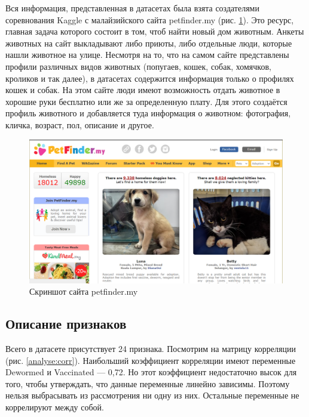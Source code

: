 \documentclass[14pt]{mmcs_article}
\begin{document}
Вся информация, представленная в датасетах была взята создателями соревнования Kaggle с малайзийского сайта petfinder.my (рис. \ref{analyse:petfinder}). Это ресурс, главная задача которого состоит в том, чтоб найти новый дом животным. Анкеты животных на сайт выкладывают либо приюты, либо отдельные люди, которые нашли животное на улице. Несмотря на то, что на самом сайте представлены профили различных видов животных (попугаев, кошек, собак, хомячков, кроликов и так далее), в датасетах содержится информация только о профилях кошек и собак. На этом сайте люди имеют возможность отдать животное в хорошие руки бесплатно или же за определенную плату. Для этого создаётся профиль животного и добавляется туда информация о животном: фотография, кличка, возраст, пол, описание и другое.

\begin{figure}[H]
	\centering
	\includegraphics[scale=0.4]{petfinder.png}
	\caption{Скриншот сайта petfinder.my}\label{analyse:petfinder}
\end{figure}


\subsection{Описание признаков}

Всего в датасете присутствует 24 признака. Посмотрим на матрицу корреляции (рис. \ref{analyse:corr}). Наибольший коэффициент корреляции имеют переменные Dewormed и Vaccinated --- 0,72. Но этот коэффициент недостаточно высок для того, чтобы утверждать, что данные переменные линейно зависимы. Поэтому нельзя выбрасывать из рассмотрения ни одну из них. Остальные переменные не коррелируют между собой.
\end{document}

